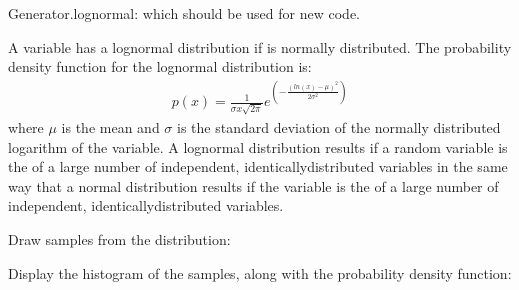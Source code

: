 \documentclass[letterpaper,10pt,english]{sphinxmanual}
\begin{document}
\begin{fulllineitems}
\begin{description}
\end{description}

Generator.lognormal: which should be used for new code.

A variable  has a log\sphinxhyphen{}normal distribution if  is normally
distributed.  The probability density function for the log\sphinxhyphen{}normal
distribution is:
\begin{equation*}
\begin{split}p(x) = \frac{1}{\sigma x \sqrt{2\pi}}
e^{(-\frac{(ln(x)-\mu)^2}{2\sigma^2})}\end{split}
\end{equation*}
where \(\mu\) is the mean and \(\sigma\) is the standard
deviation of the normally distributed logarithm of the variable.
A log\sphinxhyphen{}normal distribution results if a random variable is the 
of a large number of independent, identically\sphinxhyphen{}distributed variables in
the same way that a normal distribution results if the variable is the
 of a large number of independent, identically\sphinxhyphen{}distributed
variables.

Draw samples from the distribution:

\begin{sphinxVerbatim}[commandchars=\\\{\}]
     
    
\end{sphinxVerbatim}

Display the histogram of the samples, along with
the probability density function:

\begin{sphinxVerbatim}[commandchars=\\\{\}]
   
       
\end{sphinxVerbatim}


\end{fulllineitems}
\end{document}
